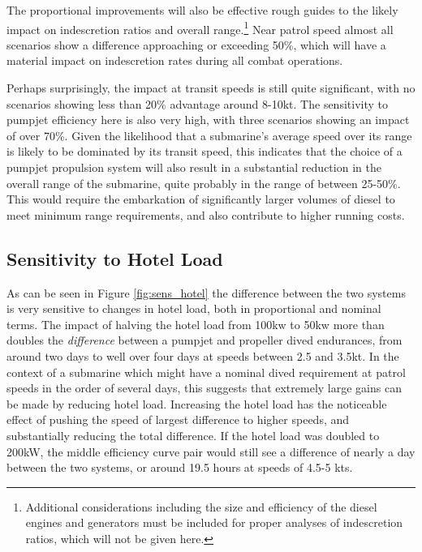 \documentclass{article}\usepackage[]{graphicx}\usepackage[]{color}
\begin{document}
The proportional improvements will also be effective rough guides to the likely impact on indescretion ratios and overall range.\footnote{Additional considerations including the size and efficiency of the diesel engines and generators must be included for proper analyses of indescretion ratios, which will not be given here.}  Near patrol speed almost all scenarios show a difference approaching or exceeding 50\%, which will have a material impact on indescretion rates during all combat operations.

Perhaps surprisingly, the impact at transit speeds is still quite significant, with no scenarios showing less than 20\% advantage around 8-10kt. The sensitivity to pumpjet efficiency here is also very high, with three scenarios showing an impact of over 70\%.  Given the likelihood that a submarine's average speed over its range is likely to be dominated by its transit speed, this indicates that the choice of a pumpjet propulsion system will also result in a substantial reduction in the overall range of the submarine, quite probably in the range of between 25-50\%.  This would require the embarkation of significantly larger volumes of diesel to meet minimum range requirements, and also contribute to higher running costs.

\subsection{Sensitivity to Hotel Load}

As can be seen in Figure \ref{fig:sens_hotel} the difference between the two systems is very sensitive to changes in hotel load, both in proportional and nominal terms.  The impact of halving the hotel load from 100kw to 50kw more than doubles the \textit{difference} between a pumpjet and propeller dived endurances, from around two days to well over four days at speeds between 2.5 and 3.5kt.  In the context of a submarine which might have a nominal dived requirement at patrol speeds in the order of several days, this suggests that extremely large gains can be made by reducing hotel load.  Increasing the hotel load has the noticeable effect of pushing the speed of largest difference to higher speeds, and substantially reducing the total difference. If the hotel load was doubled to 200kW, the middle efficiency curve pair would still see a difference of nearly a day between the two systems, or around 19.5 hours at speeds of 4.5-5 kts.
\end{document}
